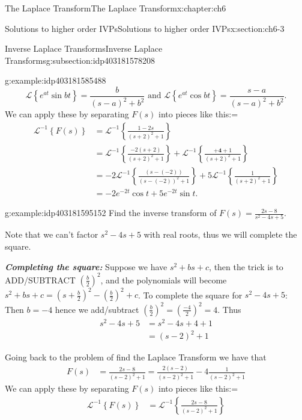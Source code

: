 \documentclass[oneside,10pt,]{book}
\newcommand{\alert}[1]{\textbf{\textit{#1}}}
\numberwithin{equation}{section}
\numberwithin{equation}{section}
\newcommand{\amp}{&}
\begin{document}
\begin{chapterptx}{The Laplace Transform}{}{The Laplace Transform}{}{}{x:chapter:ch6}
\begin{sectionptx}{Solutions to higher order IVPs}{}{Solutions to higher order IVPs}{}{}{x:section:ch6-3}
\begin{subsectionptx}{Inverse Laplace Transforms}{}{Inverse Laplace Transforms}{}{}{g:subsection:idp403181578208}
\begin{example}{}{g:example:idp403181585488}
\begin{equation*}
\mathcal{L}\left\{ e^{at}\sin bt\right\} =\frac{b}{(s-a)^{2}+b^{2}}\text{ and }\mathcal{L}\left\{ e^{at}\cos bt\right\} =\frac{s-a}{(s-a)^{2}+b^{2}}.
\end{equation*}
We can apply these by separating \(F(s)\) into pieces like this:=%
\begin{align*}
\mathcal{L}^{-1}\left\{ F(s)\right\}  \amp =\mathcal{L}^{-1}\left\{ \frac{1-2s}{\left(s+2\right)^{2}+1}\right\} \\
\amp =\mathcal{L}^{-1}\left\{ \frac{-2\left(s+2\right)}{\left(s+2\right)^{2}+1}\right\} +\mathcal{L}^{-1}\left\{ \frac{\boldsymbol{+4}+1}{\left(s+2\right)^{2}+1}\right\} \\
\amp =-2\mathcal{L}^{-1}\left\{ \frac{\left(s-\left(-2\right)\right)}{\left(s-\left(-2\right)\right)^{2}+1}\right\} +5\mathcal{L}^{-1}\left\{ \frac{1}{\left(s+2\right)^{2}+1}\right\} \\
\amp =-2e^{-2t}\cos t+5e^{-2t}\sin t.
\end{align*}
%
\end{example}
\begin{example}{}{g:example:idp403181595152}%
Find the inverse transform of \(F(s)=\frac{2s-8}{s^{2}-4s+5}\).%
\par
Note that we can't factor \(s^{2}-4s+5\) with real roots, thus we will complete the square.%
\par
\alert{Completing the square:} Suppose we have \(s^{2}+bs+c\), then the trick is to ADD\slash{}SUBTRACT \(\left(\frac{b}{2}\right)^{2}\), and the polynomials will become \(s^{2}+bs+c=\left(s+\frac{b}{2}\right)^{2}-\left(\frac{b}{2}\right)^{2}+c\). To complete the square for \(s^{2}-4s+5\): Then \(b=-4\) hence we add\slash{}subtract \(\left(\frac{b}{2}\right)^{2}=\left(\frac{-4}{2}\right)^{2}=4\). Thus%
\begin{align*}
s^{2}-4s+5 \amp =s^{2}-4s+4+1\\
\amp =\left(s-2\right)^{2}+1
\end{align*}
%
\par
Going back to the problem of find the Laplace Transform we have that%
\begin{align*}
F(s) \amp =\frac{2s-8}{\left(s-2\right)^{2}+1}=\frac{2\left(s-2\right)}{\left(s-2\right)^{2}+1}-4\frac{1}{\left(s-2\right)^{2}+1}
\end{align*}
We can apply these by separating \(F(s)\) into pieces like this:=%
\begin{align*}
\mathcal{L}^{-1}\left\{ F(s)\right\}  \amp =\mathcal{L}^{-1}\left\{ \frac{2s-8}{\left(s-2\right)^{2}+1}\right\} \\

\end{align*}
\end{example}
\end{subsectionptx}
\end{sectionptx}
\end{chapterptx}
\end{document}
